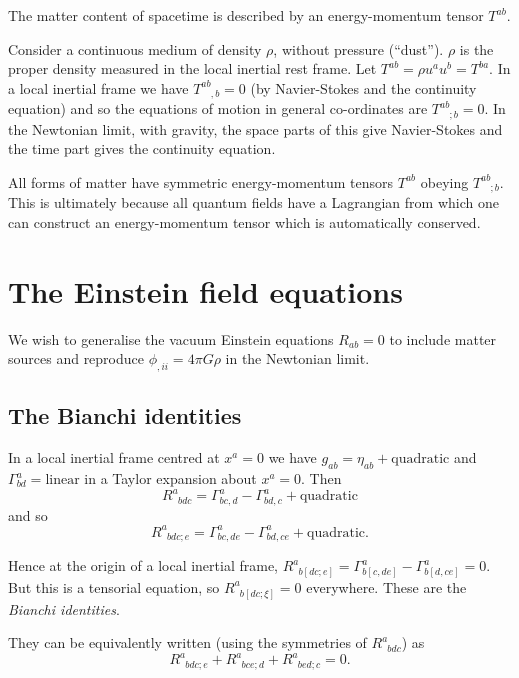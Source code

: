 \documentclass{notes}
\begin{document}
The matter content of spacetime is described by an energy-momentum
tensor $T^{a b}$.

Consider a continuous medium of density $\rho$, without pressure
(``dust'').  $\rho$ is the proper density measured in the local
inertial rest frame.  Let $T^{a b} = \rho u^a u^b = T^{b
  a}$.  In a local inertial frame we have $T^{a b}_{\phantom{a
    b},b} = 0$ (by Navier-Stokes and the continuity equation) and
so the equations of motion in general co-ordinates are $T^{a
  b}_{\phantom{a b};b} = 0$.  In the Newtonian limit, with
gravity, the space parts of this give Navier-Stokes and the time part
gives the continuity equation.

All forms of matter have symmetric energy-momentum tensors $T^{a
  b}$ obeying $T^{a b}_{\phantom{a b};b}$.  This is
  ultimately because all quantum fields have a Lagrangian from which
  one can construct an energy-momentum tensor which is automatically
  conserved.

\section{The Einstein field equations}

We wish to generalise the vacuum Einstein equations $R_{a b} = 0$
to include matter sources and reproduce $\phi_{,ii} = 4 \pi G \rho$ in
the Newtonian limit.

\subsection{The Bianchi identities}

In a local inertial frame centred at $x^a=0$ we have $g_{a b} =
\eta_{a b} + \text{quadratic}$ and $\Gamma^a_{b d}=
\text{linear}$ in a Taylor expansion about $x^a = 0$.  Then
\[
R^a_{\phantom{a} b d c} = \Gamma^a_{b c, d}
- \Gamma^a_{b d,c} + \text{quadratic}
\]
and so
\[
R^a_{\phantom{a} b d c;e} = \Gamma^a_{b c, d e}
- \Gamma^a_{b d,c e} + \text{quadratic}.
\]

Hence at the origin of a local inertial frame,
$R^a_{\phantom{a} b [d c;e]} = \Gamma^a_{b
  [c, d e]} - \Gamma^a_{b [d,c e]} = 0$.  But
this is a tensorial equation, so $R^a_{\phantom{a} b [d
  c;\xi]} = 0$ everywhere.  These are the \emph{Bianchi
  identities}.

They can be equivalently written (using the symmetries of
$R^a_{\phantom{a} b d c}$) as
\[
R^a_{\phantom{a} b d c; e}
+ R^a_{\phantom{a} b c e; d}
+ R^a_{\phantom{a} b e d; c} = 0.
\]
\end{document}

